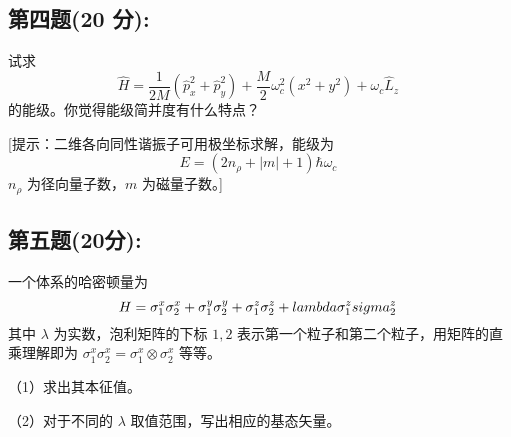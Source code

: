 \subsection{第四题(20 分):}
试求
\[\hat{H} = \frac{1}{2M} \left( \hat{p}_x^2 + \hat{p}_y^2 \right) + \frac{M}{2} \omega_c^2 \left( x^2 + y^2 \right) + \omega_c \hat{L}_z~\]
的能级。你觉得能级简并度有什么特点？

[提示：二维各向同性谐振子可用极坐标求解，能级为 
\[E = \left( 2n_\rho + |m| + 1 \right) \hbar \omega_c~\]
 $n_\rho$ 为径向量子数，$m$ 为磁量子数。]
\subsection{第五题(20分):}
一个体系的哈密顿量为 
\[H = \sigma_1^x \sigma_2^x + \sigma_1^y \sigma_2^y + \sigma_1^z \sigma_2^z + \\lambda \sigma_1^z \\sigma_2^z~\]
其中 $\lambda$ 为实数，泡利矩阵的下标 $1, 2$ 表示第一个粒子和第二个粒子，用矩阵的直乘理解即为 $\sigma_1^x \sigma_2^x = \sigma_1^x \otimes \sigma_2^x$ 等等。

（1）求出其本征值。

（2）对于不同的 $\lambda$ 取值范围，写出相应的基态矢量。